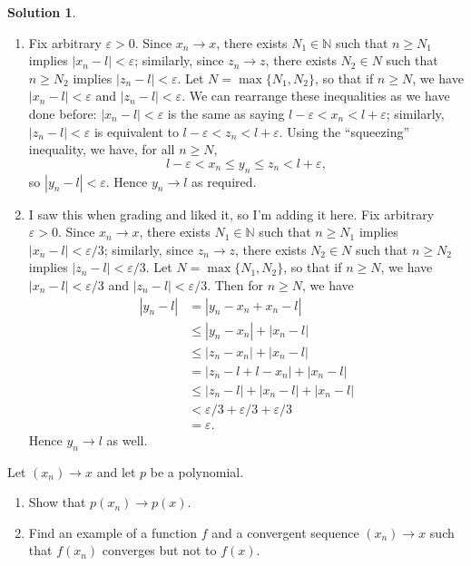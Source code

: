 \documentclass[12pt]{article}
\theoremstyle{definition}
\theoremstyle{definition}
\newtheorem*{soln}{Solution}
\newcommand{\N}{\mathbb{N}}
\begin{document}
\begin{soln}
\begin{enumerate}[label=\textbf{Method \arabic*.}]
\item Fix arbitrary $\varepsilon>0$. Since $x_n\to x$, there exists $N_1\in\N$ such that $n\geq N_1$ implies $|x_n-l|< \varepsilon$; similarly, since $z_n\to z$, there exists $N_2\in N$ such that $n\geq N_2$ implies $|z_n-l|<\varepsilon$. Let $N=\max\{N_1,N_2\}$, so that if $n\geq N$, we have $|x_n-l|<\varepsilon$ and $|z_n-l|<\varepsilon$. We can rearrange these inequalities as we have done before: $|x_n-l|<\varepsilon$ is the same as saying $l-\varepsilon<x_n<l+\varepsilon$; similarly, $|z_n-l|<\varepsilon$ is equivalent to $l-\varepsilon<z_n<l+\varepsilon$. Using the ``squeezing'' inequality, we have, for all $n\geq N$,
\[l-\varepsilon<x_n\leq y_n\leq z_n<l+\varepsilon,\]
so $|y_n-l|<\varepsilon$. Hence $y_n\to l$ as required.

\item I saw this when grading and liked it, so I'm adding it here. Fix arbitrary $\varepsilon>0$. Since $x_n\to x$, there exists $N_1\in\N$ such that $n\geq N_1$ implies $|x_n-l|< \varepsilon/3$; similarly, since $z_n\to z$, there exists $N_2\in N$ such that $n\geq N_2$ implies $|z_n-l|<\varepsilon/3$. Let $N=\max\{N_1,N_2\}$, so that if $n\geq N$, we have $|x_n-l|<\varepsilon/3$ and $|z_n-l|<\varepsilon/3$. Then for $n\geq N$, we have
\begin{align*}
|y_n-l| &= |y_n-x_n+x_n-l| \\
&\leq |y_n-x_n|+|x_n-l| \tag{by the triangle inequality}\\
&\leq |z_n-x_n|+|x_n-l| \tag{since $z_n\geq y_n\geq x_n$}\\
&= |z_n-l+l-x_n|+|x_n-l| \\
&\leq |z_n-l|+|x_n-l|+|x_n-l| \tag{by the triangle inequality again}\\
&< \varepsilon/3+\varepsilon/3+\varepsilon/3\\
&= \varepsilon.
\end{align*}
Hence $y_n\to l$ as well.
\end{enumerate}
\end{soln}

\begin{prob}
Let $(x_n)\to x$ and let $p$ be a polynomial.
\begin{enumerate}[label=(\alph*)]
\item Show that $p(x_n)\to p(x)$.

\item Find an example of a function $f$ and a convergent sequence $(x_n)\to x$ such that $f(x_n)$ converges but not to $f(x)$.
\end{enumerate}
\end{prob}
\end{document}
